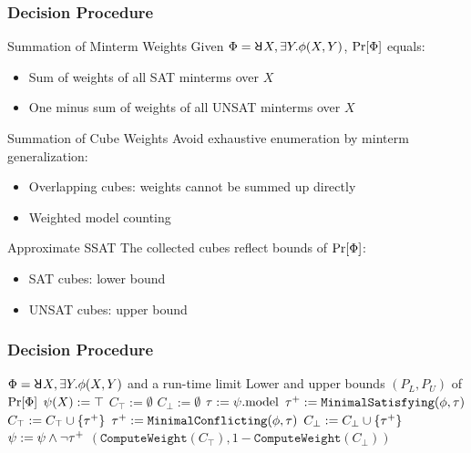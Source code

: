 \begin{frame}
    \frametitle{Decision Procedure}
    \begin{block}{Summation of Minterm Weights}
        Given $\Qf=\random{} X,\exists Y.\pf(X,Y)$, $\Pr[\Phi]$ equals:
        \pause
        \begin{itemize}
            \item Sum of weights of all SAT minterms over $X$
                  \pause
            \item One minus sum of weights of all UNSAT minterms over $X$
                  \pause
        \end{itemize}
    \end{block}
    \begin{block}{Summation of Cube Weights}
        Avoid exhaustive enumeration by minterm generalization:
        \pause
        \begin{itemize}
            \item Overlapping cubes: weights cannot be summed up directly
                  \pause
            \item Weighted model counting
                  \pause
        \end{itemize}
    \end{block}
    \begin{block}{Approximate SSAT}
        The collected cubes reflect bounds of $\Pr[\Phi]$:
        \pause
        \begin{itemize}
            \item SAT cubes: lower bound
                  \pause
            \item UNSAT cubes: upper bound
        \end{itemize}
    \end{block}
\end{frame}

\begin{frame}
    \frametitle{Decision Procedure}
    {\small
        \begin{algorithmic}[1]
            \REQUIRE
            $\Qf=\random{} X,\exists Y.\pf(X,Y)$ and a run-time limit \timeout
            \ENSURE
            Lower and upper bounds $(P_L,P_U)$ of $\Pr[\Phi]$
            \STATE $\psi(X) := \top$
            \STATE $C_\top := \emptyset$
            \STATE $C_\bot := \emptyset$
            \STATE $\tau := \psi.\mathrm{model}$
            \IF{($\sat{\pcf{\pf}{\as}}$)}
            \STATE $\tau^+ := \texttt{MinimalSatisfying}(\phi,\tau)$
            \STATE $C_\top := C_\top \cup \{\tau^+\}$
            \ELSE
            \STATE $\tau^+ := \texttt{MinimalConflicting}(\phi,\tau)$
            \STATE $C_\bot := C_\bot \cup \{\tau^+\}$
            \ENDIF
            \STATE $\psi := \psi \land \lnot\tau^+$
            \ENDWHILE
            \RETURN $(\texttt{ComputeWeight}(C_\top),1-\texttt{ComputeWeight}(C_\bot))$
        \end{algorithmic}
    }
\end{frame}

